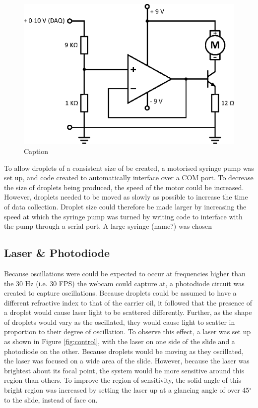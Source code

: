 \documentclass{physics_article_B}
\begin{document}
        \begin{figure}[H]
            \centering
            \hspace*{-1.8cm}\includegraphics[scale=0.8]{Figures/MotorCircuit.eps}
            \caption{Caption}
            \label{fig:MotorCircuit}
        \end{figure}
        
        To allow droplets of a consistent size of be created, a motorised syringe pump was set up, and code created to automatically interface over a COM port. To decrease the size of droplets being produced, the speed of the motor could be increased. However, droplets needed to be moved as slowly as possible to increase the time of data collection. Droplet size could therefore be made larger by increasing the speed at which the syringe pump was turned by writing code to interface with the pump through a serial port. A large syringe (name?) was chosen
    
    \subsection{Laser \& Photodiode}
    
    Because oscillations were could be expected to occur at frequencies higher than the 30 Hz (i.e. 30 FPS) the webcam could capture at, a photodiode circuit was created to capture oscillations. Because droplets could be assumed to have a different refractive index to that of the carrier oil, it followed that the presence of a droplet would cause laser light to be scattered differently. Further, as the shape of droplets would vary as the oscillated, they would cause light to scatter in proportion to their degree of oscillation. To observe this effect, a laser was set up as shown in Figure \ref{fig:control}, with the laser on one side of the slide and a photodiode on the other. Because droplets would be moving as they oscillated, the laser was focused on a wide area of the slide. However, because the laser was brightest about its focal point, the system would be more sensitive around this region than others. To improve the region of sensitivity, the solid angle of this bright region was increased by setting the laser up at a glancing angle of over 45$^{\circ}$ to the slide, instead of face on.\\
    
\end{document}
